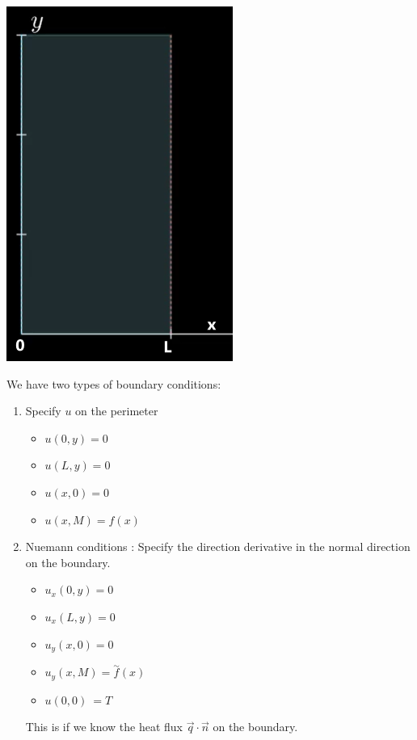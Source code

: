 \documentclass{article}
\newcommand{\twiddle}[1]{\overset{\sim}{#1}}
\begin{document}
\begin{enumerate}
  \begin{center}
    \includegraphics{Laplaces}
  \end{center}

  We have two types of boundary conditions:
  \begin{enumerate}
    \item Specify $u$ on the perimeter
    \begin{itemize}
      \item $u(0, y) = 0$
      \item $u(L, y) = 0$
      \item $u(x, 0) = 0$
      \item $u(x, M) = f(x)$
    \end{itemize}
    \item Nuemann conditions : Specify the direction derivative in the normal direction on the boundary.
    \begin{itemize}
      \item $u_x(0, y) = 0$
      \item $u_x(L, y) = 0$
      \item $u_y(x, 0) = 0$
      \item $u_y(x, M) = \twiddle{f}(x)$
      \item $u(0, 0)\  = T$
    \end{itemize}
    This is if we know the heat flux $\vec q \cdot \vec n$ on the boundary.
  \end{enumerate}
\end{enumerate}
\end{document}
